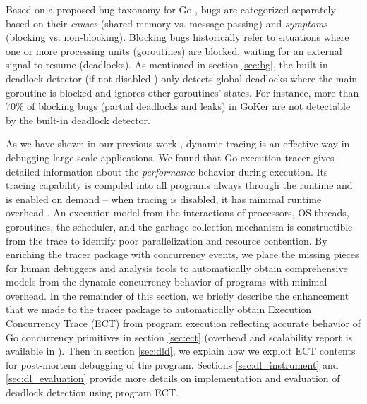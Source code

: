 Based on a proposed bug taxonomy for Go \cite{tu-concurrentBugs-asplos19}, bugs are categorized separately based on their \textit{causes} (shared-memory vs. message-passing) and \textit{symptoms} (blocking vs. non-blocking).
%
Blocking bugs historically refer to situations where one or more processing units (\eg goroutines) are blocked, waiting for an external signal to resume (\ie deadlocks).
%
As mentioned in section \ref{sec:bg}, the built-in deadlock detector (if not disabled \cite{go-netDeadlock}) only detects global deadlocks where the main goroutine is blocked and ignores other goroutines' states. For instance, more than 70\% of blocking bugs (partial deadlocks and leaks) in GoKer \cite{yuan-gobench-cgo21} are not detectable by the built-in deadlock detector.
%

As we have shown in our previous work \cite{parlot,difftrace}, dynamic tracing is an effective way in debugging large-scale applications.
%
We found that Go execution tracer \cite{go-cmd-trace} gives detailed information about the \textit{performance} behavior during execution.
%
Its tracing capability is compiled into all programs always through the runtime and is enabled on demand -- when tracing is disabled, it has minimal runtime overhead \cite{go-exec-tracer-doc}.
%
An execution model from the interactions of processors, OS threads, goroutines, the scheduler, and the garbage collection mechanism is constructible from the trace to identify poor parallelization and resource contention.
%
By enriching the tracer package with concurrency events, we place the missing pieces for human debuggers and analysis tools to automatically obtain comprehensive models from the dynamic concurrency behavior of programs with minimal overhead.
%
In the remainder of this section, we briefly describe the enhancement that we made to the tracer package to automatically obtain Execution Concurrency Trace (ECT) from program execution reflecting accurate behavior of Go concurrency primitives in section \ref{sec:ect} (overhead and scalability report is available in \cite{ect-arxiv}).
%
Then in section \ref{sec:dld}, we explain how we exploit ECT contents for post-mortem debugging of the program.
%
Sections \ref{sec:dl_instrument} and \ref{sec:dl_evaluation} provide more details on implementation and evaluation of deadlock detection using program ECT.



%


